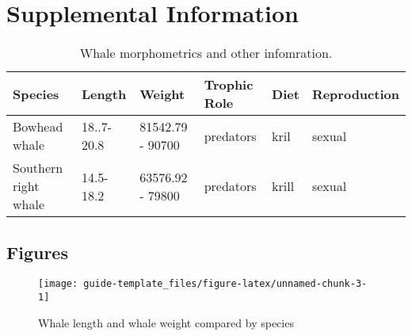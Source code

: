 \documentclass[]{article}
\begin{document}
\hypertarget{supplemental-information-1}{%
\section{Supplemental Information}\label{supplemental-information-1}}

\begin{table}

\caption{\label{tab:unnamed-chunk-2}Whale morphometrics and other infomration.}
\centering
\begin{tabular}[t]{l|l|l|l|l|l}
\hline
Species & Length & Weight & Trophic Role & Diet & Reproduction\\
\hline
Bowhead whale & 18..7-20.8 & 81542.79 - 90700 & predators & kril & sexual\\
\hline
Southern right whale & 14.5-18.2 & 63576.92 - 79800 & predators & krill & sexual\\
\hline
\end{tabular}
\end{table}

\hypertarget{figures-2}{%
\subsection{Figures}\label{figures-2}}

\begin{figure}
\texttt{[image: guide-template\_files/figure-latex/unnamed-chunk-3-1]} \caption{Whale length and whale weight compared by species}\label{fig:unnamed-chunk-3}
\end{figure}
\end{document}
